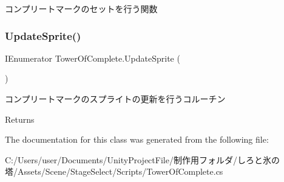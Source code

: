 コンプリートマークのセットを行う関数 

\mbox{\label{class_tower_of_complete_a1d5f5ea3a931026a6d3eb25cd3055be2}} 
\subsubsection{\texorpdfstring{Update\+Sprite()}{UpdateSprite()}}
{\footnotesize\ttfamily I\+Enumerator Tower\+Of\+Complete.\+Update\+Sprite (\begin{DoxyParamCaption}{ }\end{DoxyParamCaption})\hspace{0.3cm}{\ttfamily [inline]}}



コンプリートマークのスプライトの更新を行うコルーチン 

\begin{DoxyReturn}{Returns}

\end{DoxyReturn}


The documentation for this class was generated from the following file\+:\begin{DoxyCompactItemize}
\item 
C\+:/\+Users/user/\+Documents/\+Unity\+Project\+File/制作用フォルダ/しろと氷の塔/\+Assets/\+Scene/\+Stage\+Select/\+Scripts/Tower\+Of\+Complete.\+cs\end{DoxyCompactItemize}
